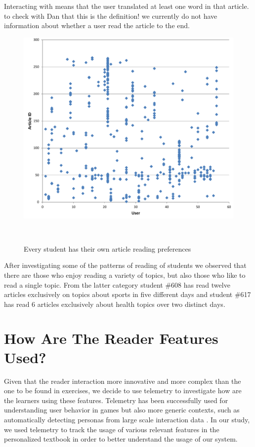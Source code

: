\begin{added}

  Interacting with means that the user translated at least one word in that article. to check with Dan that this is the definition! we currently do not have information about whether a user read the article to the end. 

\end{added}

\begin{figure}[h!]
\centering
  \includegraphics[width=0.9\columnwidth]{figures/users_articles}
  \caption{Every student has their own article reading preferences}~\label{fig:articles_read}
\end{figure}

\begin{added}

  After investigating some of the patterns of reading of students we observed that there are those who enjoy reading a variety of topics, but also those who like to read a single topic. 
  From the latter category student \#608 has read twelve articles exclusively on topics about sports in five different days and student \#617 has read 6 articles exclusively about health topics over two distinct days.
  
\end{added}

\section{How Are The Reader Features Used?}
\newcommand{\feature}[1]{{\em #1}}
Given that the reader interaction more innovative and more complex than the one to be found in exercises, we decide to use telemetry to investigate how are the learners using these features. Telemetry has been successfully used for understanding user behavior in games \cite{Gagne11-telemetry} but also more generic contexts, such as automatically detecting personas from large scale interaction data \cite{Zhang16-telemetry}. In our study, we used telemetry to track the usage of various relevant features in the personalized textbook in order to better understand the usage of our system.


